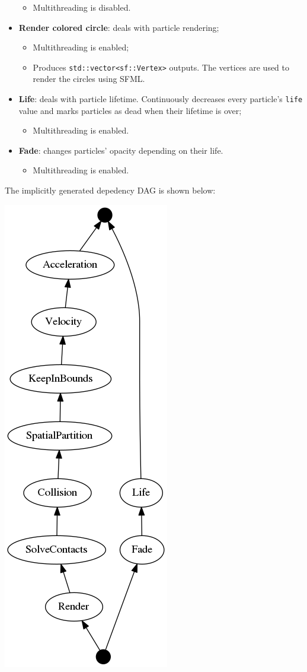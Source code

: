 \documentclass[twoside, 12pt, a4paper, openany]{book}
\let\origfigure=\figure
\let\endorigfigure=\endfigure
\renewenvironment{figure}[1][]{%
\origfigure[H]
}{%
\endorigfigure
}
\providecommand{\tightlist}{%
  \setlength{\itemsep}{0pt}\setlength{\parskip}{0pt}}
\begin{document}
\begin{itemize}
  \begin{itemize}
  \tightlist
  \item
    Multithreading is disabled.
  \end{itemize}
\item
  \textbf{Render colored circle}: deals with particle rendering;

  \begin{itemize}
  \item
    Multithreading is enabled;
  \item
    Produces
    \texttt{std::vector<sf::Vertex>}
    outputs. The vertices are used to render the circles using SFML.
  \end{itemize}
\item
  \textbf{Life}: deals with particle lifetime. Continuously decreases
  every particle's
  \texttt{life}
  value and marks particles as dead when their lifetime is over;

  \begin{itemize}
  \tightlist
  \item
    Multithreading is enabled.
  \end{itemize}
\item
  \textbf{Fade}: changes particles' opacity depending on their life.

  \begin{itemize}
  \tightlist
  \item
    Multithreading is enabled.
  \end{itemize}
\end{itemize}

The implicitly generated depedency DAG is shown below:

\begin{figure}[htbp]
\centering
\includegraphics[height=0.85000\textwidth]{source/figures/generated/sim/dag0.png}
\caption{Particle simulation: dependency DAG}
\end{figure}
\end{document}
